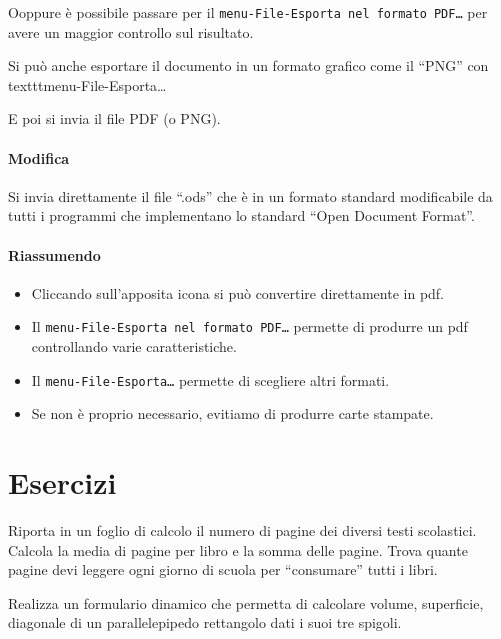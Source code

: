 Ooppure è possibile passare per il \texttt{menu-File-Esporta nel 
formato PDF\dots} per avere un maggior controllo sul risultato.

Si può anche esportare il documento in un formato grafico come il ``PNG'' con 
texttt{menu-File-Esporta\dots}

E poi si invia il file PDF (o PNG).

\paragraph{Modifica}
Si invia direttamente il file ``.ods'' che è in un formato standard 
modificabile da tutti i programmi che implementano lo standard 
``Open Document Format''.

\paragraph{Riassumendo}

\begin{itemize} [nosep]
\item Cliccando sull'apposita icona si può convertire direttamente in pdf.
\item Il \texttt{menu-File-Esporta nel formato PDF\dots} permette di produrre 
un pdf controllando varie caratteristiche.
\item Il \texttt{menu-File-Esporta\dots} permette di scegliere altri formati.
\item Se non è proprio necessario, evitiamo di produrre carte stampate.
\end{itemize}

\section{Esercizi}
\label{fogliodicalcolo:esercizi}

\begin{esercizio}
Riporta in un foglio di calcolo il numero di pagine dei diversi testi
scolastici. Calcola la media di pagine per libro e la somma delle pagine.
Trova quante pagine devi leggere ogni giorno di scuola per
``consumare'' tutti i libri.
\end{esercizio}

\begin{esercizio}
Realizza un formulario dinamico che permetta di calcolare volume,
superficie, diagonale di un parallelepipedo rettangolo
dati i suoi tre spigoli.
\end{esercizio}

